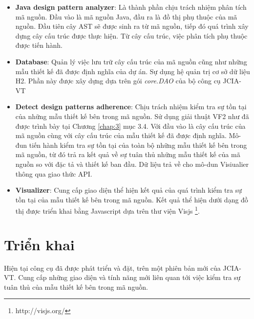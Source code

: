 \documentclass[12pt]{report}
\begin{document}
\begin{itemize}
	\item \noindent \textbf{Java design pattern analyzer}: Là thành phần chịu trách nhiệm phân tích mã nguồn. Đầu vào là mã nguồn Java, đầu ra là đồ thị phụ thuộc của mã nguồn. Đầu tiên cây AST sẽ được sinh ra từ mã nguồn, tiếp đó quá trình xây dựng cây cấu trúc được thực hiện. Từ cây cấu trúc, việc phân tích phụ thuộc được tiến hành.
	\item \noindent \textbf{Database}: Quản lý việc lưu trữ cây cấu trúc của mã nguồn cũng như những mẫu thiết kế đã được định nghĩa của dự án. Sự dụng hệ quản trị cơ sở dữ liệu H2. Phần này được xây dựng dựa trên gói \textit{core.DAO} của bộ công cụ JCIA-VT
	\item \noindent \textbf{Detect design patterns adherence}: Chịu trách nhiệm kiểm tra sự tồn tại của những mẫu thiết kế bên trong mã nguồn. Sử dụng giải thuật VF2 như đã được trình bày tại Chương \ref{chap:3} mục 3.4. Với đầu vào là cây cấu trúc của mã nguồn cùng với cây cấu trúc của mẫu thiết kế đã được định nghĩa. Mô-đun tiến hành kiểm tra sự tồn tại của toàn bộ những mẫu thiết kế bên trong mã nguồn, từ đó trả ra kết quả về sự tuân thủ những mẫu thiết kế của mã nguồn so với đặc tả và thiết kế ban đầu. Dữ liệu trả về cho mô-dun Visiualier thông qua giao thức API.
	\item \noindent \textbf{Visualizer}: Cung cấp giao diện thể hiện kết quả của quá trình kiểm tra sự tồn tại của mẫu thiết kế bên trong mã nguồn. Kết quả thể hiện dưới dạng đồ thị được triển khai bằng Javascript dựa trên thư viện Visjs \footnote{http://visjs.org/}.  
\end{itemize}
\section{Triển khai}
Hiện tại công cụ đã được phát triển và đặt, trên một phiên bản mới của JCIA-VT. Cung cấp những giao diện và tính năng mới liên quan tới việc kiểm tra sự tuân thủ của mẫu thiết kế bên trong mã nguồn.
\end{document}
